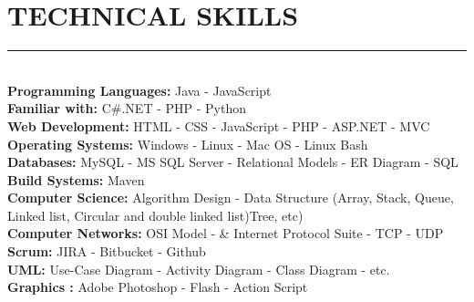 \documentclass[10pt,a4paper]{article}
\begin{document}
\section{TECHNICAL SKILLS}
\noindent \rule {18.0cm}{0.2pt} \\
\noindent
\textbullet \hspace{0.1cm}\textbf{Programming Languages:} Java - JavaScript \\
\textbullet \hspace{0.1cm}\textbf{Familiar with:} C\#.NET - PHP - Python \\
\textbullet \hspace{0.1cm}\textbf{Web Development:} HTML - CSS - JavaScript - PHP - ASP.NET - MVC \\
\textbullet \hspace{0.1cm}\textbf{Operating Systems:} Windows - Linux - Mac OS - Linux Bash \\
\textbullet \hspace{0.1cm}\textbf{Databases:} MySQL - MS SQL Server - Relational Models - ER Diagram - SQL \\
\textbullet \hspace{0.1cm}\textbf{Build Systems:} Maven \\
\textbullet \hspace{0.1cm}\textbf{Computer Science:} Algorithm Design - Data Structure (Array, Stack, Queue, Linked list, Circular and double linked list)Tree, etc) \\
\textbullet \hspace{0.1cm}\textbf{Computer Networks:} OSI Model - \& Internet Protocol Suite - TCP - UDP \\
\textbullet \hspace{0.1cm}\textbf{Scrum:} JIRA - Bitbucket - Github \\
\textbullet \hspace{0.1cm}\textbf{UML:} Use-Case Diagram - Activity Diagram - Class Diagram - etc. \\
\textbullet \hspace{0.1cm}\textbf{Graphics :} Adobe Photoshop - Flash - Action Script \\
\end{document}
